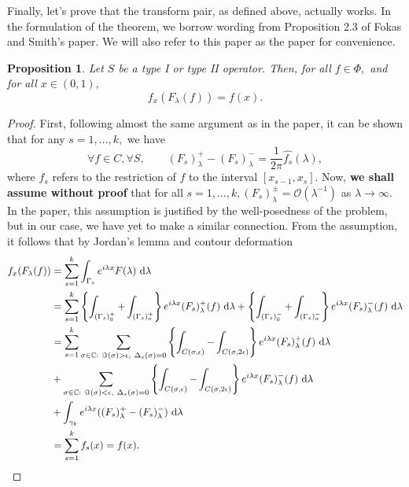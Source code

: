 \documentclass[11pt,reqno,oneside,a4paper]{article}
\theoremstyle{plain} %
\newtheorem{proposition}{Proposition}
\theoremstyle{definition}
\theoremstyle{remark}
\begin{document}
Finally, let's prove that the transform pair, as defined above, actually works. In the formulation of the theorem, we borrow wording from Proposition 2.3 of Fokas and Smith's paper. We will also refer to this paper as the paper for convenience. 
\newline
\begin{proposition}
Let $S$ be a type I or type II operator. Then, for all $f \in \Phi,$ and for all $x \in (0,1),$
\[ 
f_x(F_{\lambda}(f)) = f(x).
\]
\end{proposition}
\begin{proof}
First, following almost the same argument as in the paper, it can be shown that for any $s = 1, \ldots, k,$ we have 
\[ \forall f \in C, \forall S, \qquad (F_s)^+_{\lambda} - (F_s)^-_{\lambda} = \frac{1}{2 \pi} \hat{f_s}(\lambda),\]
where $f_s$ refers to the restriction of $f$ to the interval $[x_{s-1}, x_s].$ Now, \textbf{we shall assume without proof} that for all $s = 1, \ldots, k, (F_s)^{\pm}_{\lambda} = \mathcal{O}(\lambda^{-1})$ as $\lambda \to \infty.$ In the paper, this assumption is justified by the well-posedness of the problem, but in our case, we have yet to make a similar connection. From the assumption, it follows that by Jordan's lemma and contour deformation
\begin{align*}
f_x(F_{\lambda}(f)) &= \sum^k_{s=1} \int_{\Gamma_s} e^{i\lambda x} F(\lambda) ~\mathrm{d} \lambda \\
&=  \sum^k_{s=1} \left\{ \int_{(\Gamma_s)_0^+} + \int_{(\Gamma_s)_a^+}\right\} e^{i \lambda x} (F_s)^+_{\lambda}(f) ~\mathrm{d} \lambda + \left\{ \int_{(\Gamma_s)_0^-} + \int_{(\Gamma_s)_a^-}\right\} e^{i \lambda x} (F_s)^-_{\lambda}(f) ~\mathrm{d} \lambda \\ 
&=  \sum^k_{s=1}  \sum_{\sigma \in \mathbb{C}: ~\Im(\sigma) > \epsilon, ~\Delta_s(\sigma) = 0} \left\{ \int_{C(\sigma, \epsilon)} - \int_{C(\sigma, 2\epsilon)}\right\} e^{i \lambda x} (F_s)^+_{\lambda}(f) ~\mathrm{d} \lambda \\
&+ \sum_{\sigma \in \mathbb{C}: ~\Im(\sigma) < \epsilon, ~\Delta_s(\sigma) = 0} \left\{ \int_{C(\sigma, \epsilon)} - \int_{C(\sigma, 2\epsilon)}\right\} e^{i \lambda x} (F_s)^-_{\lambda}(f) ~\mathrm{d} \lambda \\
&+ \int_{\gamma_k} e^{i\lambda x} ((F_s)^+_{\lambda} - (F_s)^-_{\lambda})~\mathrm{d} \lambda \\
&=  \sum^k_{s=1} f_s(x) = f(x). \qedhere
\end{align*} 
\end{proof}
\end{document}
